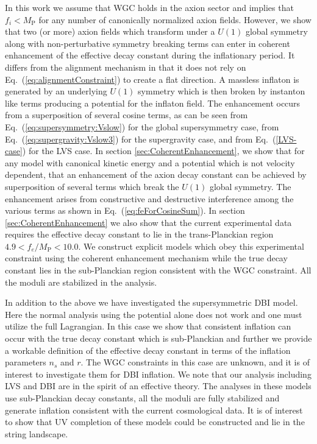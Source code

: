 \documentclass[12pt]{article}
\begin{document}
In this work we assume that WGC holds in the axion sector and implies that $f_i < M_\text{P}$ for any number of canonically normalized axion fields.
However, we show that two (or more) axion fields which transform under a $U\left(1\right)$ global symmetry along with non-perturbative symmetry breaking terms can enter in coherent enhancement of the effective decay constant during the inflationary period.
It differs from the alignment mechanism in that it does not rely on Eq.~(\ref{eq:alignmentConstraint}) to create a flat direction.
A massless inflaton is generated by an underlying $U\left(1\right)$ symmetry which is then broken by instanton like terms producing a potential for the inflaton field.
The enhancement occurs from a superposition of several cosine terms, as can be seen from Eq.~(\ref{eq:supersymmetry:Vslow}) for the global supersymmetry case, from Eq.~(\ref{eq:supergravity:Vslow3}) for the supergravity case, and from Eq.~(\ref{LVS-case}) for the LVS case.
In section \ref{sec:CoherentEnhancement}, we show that for any model with canonical kinetic energy and a potential which is not velocity dependent, that an enhancement of the axion decay constant can be achieved by superposition of several terms which break the $U\left(1\right)$ global symmetry.
The enhancement arises from constructive and destructive interference among the various terms as shown in Eq.~(\ref{eq:feForCosineSum}).
In section \ref{sec:CoherentEnhancement} we also show that the current experimental data requires the effective decay constant to lie in the trans-Planckian region $4.9 < f_e / M_\text{P} < 10.0$.
We construct explicit models which obey this experimental constraint using the coherent enhancement mechanism while the true decay constant lies in the sub-Planckian region consistent with the WGC constraint.
All the moduli are stabilized in the analysis.

In addition to the above we have investigated the supersymmetric DBI model.
Here the normal analysis using the potential alone does not work and one must utilize the full Lagrangian.
In this case we show that consistent inflation can occur with the true decay constant which is sub-Planckian and further we provide a workable definition of the effective decay constant in terms of the inflation parameters $n_s$ and $r$.
The WGC constraints in this case are unknown, and it is of interest to investigate
 them for DBI inflation.
We note that our analysis including LVS and DBI are in the spirit of an effective theory.
The analyses in these models use sub-Planckian decay constants, all the moduli are fully stabilized and generate inflation consistent with the current cosmological data.
It is of interest to show that UV completion of these models could be constructed and lie in the string landscape.
\end{document}
